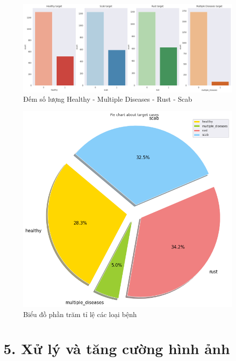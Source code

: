 \documentclass{article}
\begin{document}
	\begin{figure}[H]
		\centering
		\includegraphics[width=1\linewidth]{images/counting_plot_target.png}
		\caption{Đếm số lượng Healthy - Multiple Diseases - Rust - Scab}
		\label{fig:writing-thesis}
	\end{figure}
	\begin{figure}[H]
		\centering
		\includegraphics[width=.75\linewidth]{images/pie_chart_targer_plot.png}
		\caption{Biểu đồ phần trăm tỉ lệ các loại bệnh}
		\label{fig:writing-thesis}
	\end{figure}
	\section{5. Xử lý và tăng cường hình ảnh}
\end{document}
